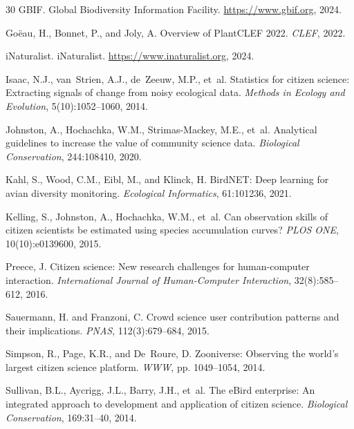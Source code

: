 \documentclass[11pt,a4paper]{article}
\begin{document}
\begin{thebibliography}{30}
GBIF.
\newblock Global Biodiversity Information Facility.
\newblock \url{https://www.gbif.org}, 2024.

Go{\"e}au, H., Bonnet, P., and Joly, A.
\newblock Overview of PlantCLEF 2022.
\newblock \emph{CLEF}, 2022.

iNaturalist.
\newblock iNaturalist.
\newblock \url{https://www.inaturalist.org}, 2024.

Isaac, N.J., van~Strien, A.J., de~Zeeuw, M.P., et~al.
\newblock Statistics for citizen science: Extracting signals of change from
  noisy ecological data.
\newblock \emph{Methods in Ecology and Evolution}, 5(10):1052--1060, 2014.

Johnston, A., Hochachka, W.M., Strimas-Mackey, M.E., et~al.
\newblock Analytical guidelines to increase the value of community science data.
\newblock \emph{Biological Conservation}, 244:108410, 2020.

Kahl, S., Wood, C.M., Eibl, M., and Klinck, H.
\newblock BirdNET: Deep learning for avian diversity monitoring.
\newblock \emph{Ecological Informatics}, 61:101236, 2021.

Kelling, S., Johnston, A., Hochachka, W.M., et~al.
\newblock Can observation skills of citizen scientists be estimated using species
  accumulation curves?
\newblock \emph{PLOS ONE}, 10(10):e0139600, 2015.

Preece, J.
\newblock Citizen science: New research challenges for human-computer
  interaction.
\newblock \emph{International Journal of Human-Computer Interaction},
  32(8):585--612, 2016.

Sauermann, H. and Franzoni, C.
\newblock Crowd science user contribution patterns and their implications.
\newblock \emph{PNAS}, 112(3):679--684, 2015.

Simpson, R., Page, K.R., and De~Roure, D.
\newblock Zooniverse: Observing the world's largest citizen science platform.
\newblock \emph{WWW}, pp. 1049--1054, 2014.

Sullivan, B.L., Aycrigg, J.L., Barry, J.H., et~al.
\newblock The eBird enterprise: An integrated approach to development and
  application of citizen science.
\newblock \emph{Biological Conservation}, 169:31--40, 2014.


\end{thebibliography}
\end{document}
